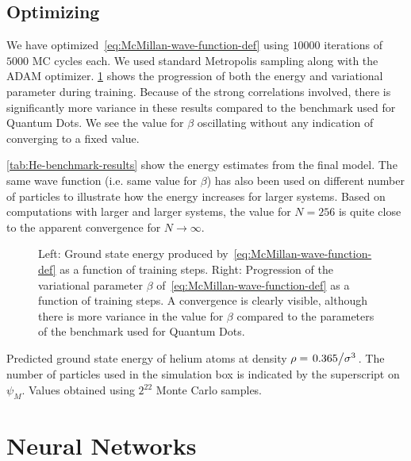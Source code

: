 \documentclass[Thesis.tex]{subfiles}
\begin{document}
\subsection{Optimizing}

We have optimized~\cref{eq:McMillan-wave-function-def} using $\num{10000}$
iterations of $\num{5000}$ MC cycles each. We used standard Metropolis sampling
along with the ADAM optimizer. \cref{fig:He-benchmark-training} shows the
progression of both the energy and variational parameter during training.
Because of the strong correlations involved, there is significantly more
variance in these results compared to the benchmark used for Quantum Dots. We
see the value for $\beta$ oscillating without any indication of converging to a
fixed value.

\cref{tab:He-benchmark-results} show the energy estimates from the final model.
The same wave function (i.e. same value for $\beta$) has also been used on
different number of particles to illustrate how the energy increases for larger
systems. Based on computations with larger and larger systems, the value for $N
= 256$ is quite close to the apparent convergence for $N\to\infty$.

\begin{figure}[h]
  \centering
  
  \caption{Left: Ground state energy produced by~\cref{eq:McMillan-wave-function-def}
    as a function of training steps. Right: Progression of the variational
    parameter $\beta$ of~\cref{eq:McMillan-wave-function-def} as a function of
    training steps. A convergence is clearly visible, although there is more
    variance in the value for $\beta$ compared to the parameters of the
    benchmark used for Quantum Dots.}
  \label{fig:He-benchmark-training}
\end{figure}

\begin{table}[h]
  \centering
  
  \caption{Predicted ground state energy of helium atoms at density $\rho =
\flatfrac{0.365}{\sigma^3}$. The number of particles used in the simulation box
is indicated by the superscript on $\psi_M$. Values obtained using $2^{22}$
Monte Carlo samples.}
  \label{tab:He-benchmark-results}
\end{table}


\section{Neural Networks}
\end{document}
